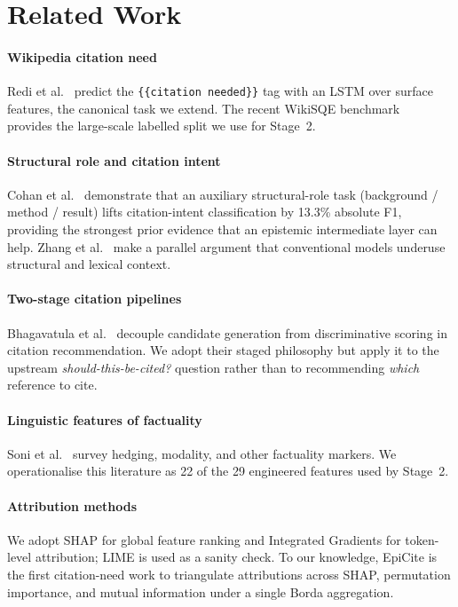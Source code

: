 \documentclass[conference]{IEEEtran}
\begin{document}
\section{Related Work}

\paragraph{Wikipedia citation need}
Redi et al.~\cite{redi2019citation} predict the
\texttt{\{\{citation~needed\}\}} tag with an LSTM over surface features,
the canonical task we extend. The recent WikiSQE
benchmark~\cite{wikisqe} provides the large-scale labelled split we
use for Stage~2.

\paragraph{Structural role and citation intent}
Cohan et al.~\cite{cohan2019structural} demonstrate that an auxiliary
structural-role task (background / method / result) lifts citation-intent
classification by 13.3\% absolute F1, providing the strongest prior
evidence that an epistemic intermediate layer can help. Zhang et
al.~\cite{zhang2020dual} make a parallel argument that conventional models
underuse structural and lexical context.

\paragraph{Two-stage citation pipelines}
Bhagavatula et al.~\cite{bhagavatula2018content} decouple candidate
generation from discriminative scoring in citation recommendation. We
adopt their staged philosophy but apply it to the upstream
\emph{should-this-be-cited?} question rather than to recommending
\emph{which} reference to cite.

\paragraph{Linguistic features of factuality}
Soni et al.~\cite{soni2021survey} survey hedging, modality, and other
factuality markers. We operationalise this literature as 22 of the 29
engineered features used by Stage~2.

\paragraph{Attribution methods}
We adopt SHAP \cite{lundberg2017shap} for global feature ranking and
Integrated Gradients \cite{sundararajan2017axiomatic} for token-level
attribution; LIME \cite{ribeiro2016lime} is used as a sanity check. To our
knowledge, EpiCite is the first citation-need work to triangulate
attributions across SHAP, permutation importance, and mutual information
under a single Borda aggregation.
\end{document}
